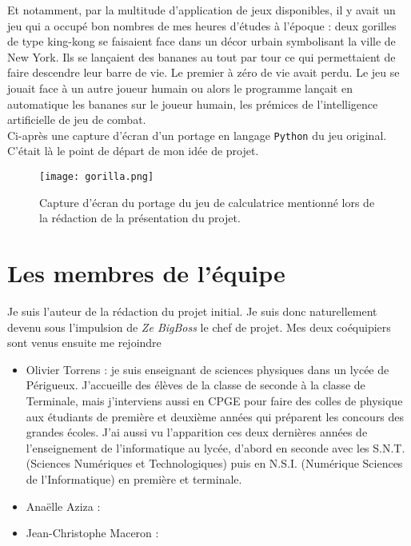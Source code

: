 \documentclass{tstextbook}
\begin{document}
Et notamment, par la multitude d'application de jeux disponibles, il y avait un jeu qui a occupé bon nombres de mes heures d'études à l'époque : deux gorilles de type king-kong se faisaient face dans un décor urbain symbolisant la ville de New York. Ils se lançaient des bananes au tout par tour ce qui permettaient de faire descendre leur barre de vie. Le premier à zéro de vie avait perdu. Le jeu se jouait face à un autre joueur humain ou alors le programme lançait en automatique les bananes sur le joueur humain, les prémices de l'intelligence artificielle de jeu de combat. \\
Ci-après une capture d'écran d'un portage en langage \texttt{Python} du jeu original. C'était là le point de départ de mon idée de projet.


\begin{figure}[!h]
\centering
\texttt{[image: gorilla.png]}
\caption{Capture d'écran du portage du jeu de calculatrice mentionné lors de la rédaction de la présentation du projet. %
}
\end{figure}



\section{Les membres de l’équipe}

Je suis l'auteur de la rédaction du projet initial. Je suis donc naturellement devenu sous l'impulsion de \emph{Ze BigBoss} le chef de projet. Mes deux coéquipiers sont venus ensuite me rejoindre
\begin{itemize}
\item Olivier Torrens : je suis enseignant de sciences physiques dans un lycée de Périgueux. J'accueille des élèves de la classe de seconde à la classe de Terminale, mais j'interviens aussi en CPGE pour faire des colles de physique aux étudiants de première et deuxième années qui préparent les concours des grandes écoles. J'ai aussi vu l'apparition ces deux dernières années de l'enseignement de l'informatique au lycée, d'abord en seconde avec les S.N.T. (Sciences Numériques et Technologiques) puis en N.S.I. (Numérique Sciences de l'Informatique) en première et terminale.
\item Anaëlle Aziza :  
\item Jean-Christophe Maceron :
\end{itemize}
\end{document}
